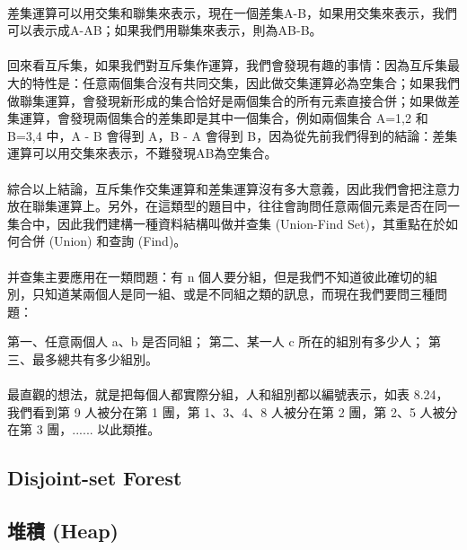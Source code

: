 \documentclass[12pt,a4paper,oneside]{report}
\begin{document}
\begin{CJK}{UTF8}{bkai}
\paragraph{}差集運算可以用交集和聯集來表示，現在一個差集A-B，如果用交集來表示，我們可以表示成A-AB；如果我們用聯集來表示，則為AB-B。

\paragraph{}回來看互斥集，如果我們對互斥集作運算，我們會發現有趣的事情：因為互斥集最大的特性是：任意兩個集合沒有共同交集，因此做交集運算必為空集合；如果我們做聯集運算，會發現新形成的集合恰好是兩個集合的所有元素直接合併；如果做差集運算，會發現兩個集合的差集即是其中一個集合，例如兩個集合 A={1,2} 和 B={3,4} 中，A - B 會得到 A，B - A 會得到 B，因為從先前我們得到的結論：差集運算可以用交集來表示，不難發現AB為空集合。

\paragraph{}綜合以上結論，互斥集作交集運算和差集運算沒有多大意義，因此我們會把注意力放在聯集運算上。另外，在這類型的題目中，往往會詢問任意兩個元素是否在同一集合中，因此我們建構一種資料結構叫做并查集 (Union-Find Set)，其重點在於如何合併 (Union) 和查詢 (Find)。

\paragraph{}并查集主要應用在一類問題：有 n 個人要分組，但是我們不知道彼此確切的組別，只知道某兩個人是同一組、或是不同組之類的訊息，而現在我們要問三種問題：

第一、任意兩個人 a、b 是否同組；
第二、某一人 c 所在的組別有多少人；
第三、最多總共有多少組別。

\paragraph{}最直觀的想法，就是把每個人都實際分組，人和組別都以編號表示，如表 8.24，我們看到第 9 人被分在第 1 團，第 1、3、4、8 人被分在第 2 團，第 2、5 人被分在第 3 團，...... 以此類推。


\subsection{Disjoint-set Forest}
\subsection{堆積 (Heap)}

\end{CJK}
\end{document}
